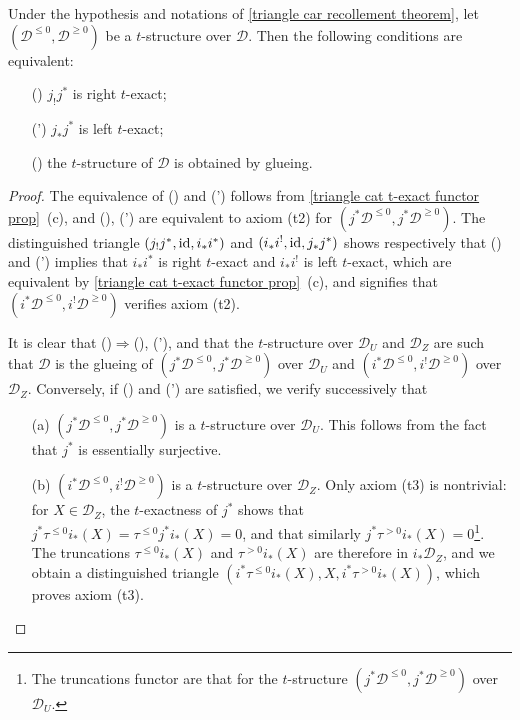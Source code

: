 \begin{proposition}\label{triangle car recollement t-structure iff}
Under the hypothesis and notations of \cref{triangle car recollement theorem}, let $(\mathcal{D}^{\leq 0},\mathcal{D}^{\geq 0})$ be a $t$-structure over $\mathcal{D}$. Then the following conditions are equivalent:
\begin{enumerate}
    \item[(\rmnum{1})] $j_!j^*$ is right $t$-exact;
    \item[(\rmnum{1}')] $j_*j^*$ is left $t$-exact;
    \item[(\rmnum{2})] the $t$-structure of $\mathcal{D}$ is obtained by glueing.
\end{enumerate}
\end{proposition}
\begin{proof}
The equivalence of () and (') follows from \cref{triangle cat t-exact functor prop}~(c), and (), (') are equivalent to axiom (t2) for $(j^*\mathcal{D}^{\leq 0},j^*\mathcal{D}^{\geq 0})$. The distinguished triangle $(j_!j^*,\operatorname{id},i_*i^*)$ and $(i_*i^!,\operatorname{id},j_*j^*)$ shows respectively that () and (') implies that $i_*i^*$ is right $t$-exact and $i_*i^!$ is left $t$-exact, which are equivalent by \cref{triangle cat t-exact functor prop}~(c), and signifies that $(i^*\mathcal{D}^{\leq 0},i^!\mathcal{D}^{\geq 0})$ verifies axiom (t2).\par
It is clear that ()$\Rightarrow$(), ('), and that the $t$-structure over $\mathcal{D}_U$ and $\mathcal{D}_Z$ are such that $\mathcal{D}$ is the glueing of $(j^*\mathcal{D}^{\leq 0},j^*\mathcal{D}^{\geq 0})$ over $\mathcal{D}_U$ and $(i^*\mathcal{D}^{\leq 0},i^!\mathcal{D}^{\geq 0})$ over $\mathcal{D}_Z$. Conversely, if () and (') are satisfied, we verify successively that
\begin{enumerate}
    \item[(a)] $(j^*\mathcal{D}^{\leq 0},j^*\mathcal{D}^{\geq 0})$ is a $t$-structure over $\mathcal{D}_U$. This follows from the fact that $j^*$ is essentially surjective.
    \item[(b)] $(i^*\mathcal{D}^{\leq 0},i^!\mathcal{D}^{\geq 0})$ is a $t$-structure over $\mathcal{D}_Z$. Only axiom (t3) is nontrivial: for $X\in\mathcal{D}_Z$, the $t$-exactness of $j^*$ shows that $j^*\tau^{\leq 0}i_*(X)=\tau^{\leq 0}j^*i_*(X)=0$, and that similarly $j^*\tau^{>0}i_*(X)=0$\footnote{The truncations functor are that for the $t$-structure $(j^*\mathcal{D}^{\leq 0},j^*\mathcal{D}^{\geq 0})$ over $\mathcal{D}_U$.}. The truncations $\tau^{\leq 0}i_*(X)$ and $\tau^{>0}i_*(X)$ are therefore in $i_*\mathcal{D}_Z$, and we obtain a distinguished triangle $(i^*\tau^{\leq 0}i_*(X),X,i^*\tau^{>0}i_*(X))$, which proves axiom (t3).

\end{enumerate}
\end{proof}
